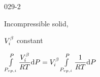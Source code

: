 \begin{mitframe}{029-2}
\begin{listone}
\begin{listtwo}
\begin{listthree}
			\end{listthree}
            
         	\item Incompressible solid,
        	
            \begin{listthree}
            
            	\item$\vol_{\state}^{\texpcoeff}$ constant
                
                \item$\int\limits_{\p_{vp,\state}}^{\p}\dfrac{\vol_{\state}^{\texpcoeff}}{\gasconst\Temp}\mathrm{d}\p=\vol_{\state}^{\texpcoeff}\int\limits_{\p_{vp,\state}}^{\p}\dfrac{1}{\gasconst\Temp}\mathrm{d}\p$
                

			\end{listthree}                       

		\end{listtwo}

\end{listone}
        
        
        
\end{mitframe}